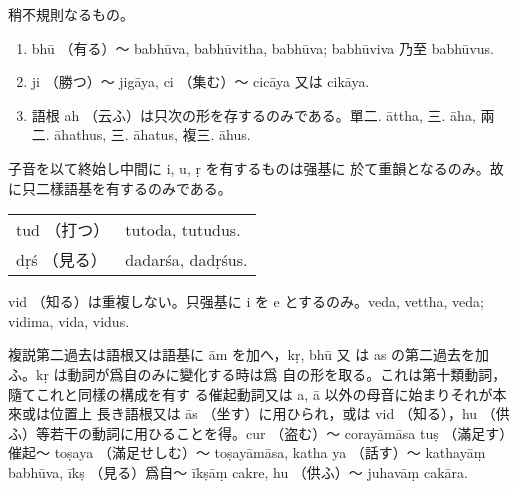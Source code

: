 \numberParagraph
稍不規則なるもの。
\begin{enumerate}[label=(\alph*)]
\item bhū （有る）～ babhūva, babhūvitha, babhūva;
babhūviva 乃至 babhūvus.
\item ji （勝つ）～ jigāya, ci （集む）～ cicāya 又は cikāya.
\item 語根 ah （云ふ）は只次の形を存するのみである。單二.
āttha, 三. āha, 兩二. āhathus, 三. āhatus, 複三. āhus.
\end{enumerate}

\numberParagraph
子音を以て終始し中間に i, u, ṛ を有するものは强基に
於て重韻となるのみ。故に只二樣語基を有するのみである。

\begin{tabular}{ll}
  tud （打つ） & tutoda, tutudus. \\
  dṛś （見る） & dadarśa, dadṛśus.
\end{tabular}

vid （知る）は重複しない。只强基に i を e とするのみ。veda,
vettha, veda; vidima, vida, vidus.

\numberParagraph
複説第二過去は語根又は語基に ām を加へ，kṛ, bhū 又
は as の第二過去を加ふ。kṛ は動詞が爲自のみに變化する時は爲
自の形を取る。これは第十類動詞，隨てこれと同樣の構成を有す
る催起動詞又は a, ā 以外の母音に始まりそれが本來或は位置上
長き語根又は ās （坐す）に用ひられ，或は vid （知る），hu （供
ふ）等若干の動詞に用ひることを得。cur （盗む）～ corayāmāsa
tuṣ （滿足す）催起～ toṣaya （滿足せしむ）～ toṣayāmāsa, katha\-%
ya （話す）～ kathayāṃ babhūva, īkṣ （見る）爲自～ īkṣāṃ cakre,
hu （供ふ）～ juhavāṃ cakāra.

